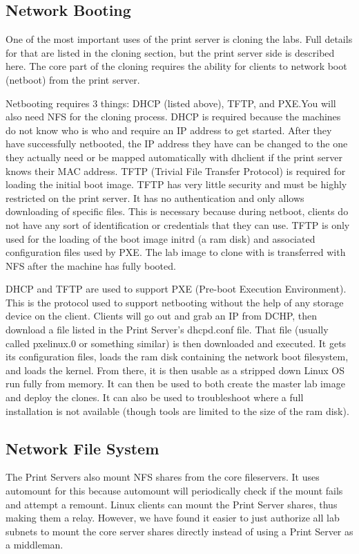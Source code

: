 \subsection{Network Booting}
One of the most important uses of the print server is cloning the labs.  Full details for that are listed in the cloning section, but the print server side is described here.  The core part of the cloning requires the ability for clients to network boot (netboot) from the print server.  

Netbooting requires 3 things:  DHCP (listed above), TFTP, and PXE.You will also need NFS for the cloning process.  DHCP is required because the machines do not know who is who and require an IP address to get started.  After they have successfully netbooted, the IP address they have can be changed to the one they actually need or be mapped automatically with dhclient if the print server knows their MAC address.  
\pargraph
TFTP (Trivial File Transfer Protocol) is required for loading the initial boot image.  TFTP has very little security and must be highly restricted on the print server.  It has no authentication and only allows downloading of specific files.  This is necessary because during netboot, clients do not have any sort of identification or credentials that they can use.  TFTP is only used for the loading of the boot image initrd (a ram disk) and associated configuration files used by PXE.  The lab image to clone with is transferred with NFS after the machine has fully booted.  

DHCP and TFTP are used to support PXE (Pre-boot Execution Environment).  This is the protocol used to support netbooting without the help of any storage device on the client.  Clients will go out and grab an IP from DCHP, then download a file listed in the Print Server's dhcpd.conf file.  That file (usually called pxelinux.0 or something similar) is then downloaded and executed.  It gets its configuration files, loads the ram disk containing the network boot filesystem, and loads the kernel.  From there, it is then usable as a stripped down Linux OS run fully from memory.  It can then be used to both create the master lab image and deploy the clones.  It can also be used to troubleshoot where a full installation is not available (though tools are limited to the size of the ram disk).
\subsection{Network File System}
The Print Servers also mount NFS shares from the core fileservers.  It uses automount for this because automount will periodically check if the mount fails and attempt a remount.  Linux clients can mount the Print Server shares, thus making them a relay.  However, we have found it easier to just authorize all lab subnets to mount the core server shares directly instead of using a Print Server as a middleman.  

